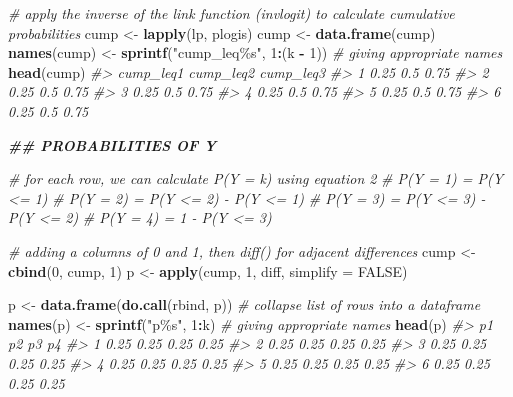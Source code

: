 \documentclass[
  man,floatsintext]{apa6}
\newenvironment{Shaded}{\begin{snugshade}}{\end{snugshade}}
\newcommand{\AttributeTok}[1]{\textcolor[rgb]{0.13,0.29,0.53}{#1}}
\newcommand{\CommentTok}[1]{\textcolor[rgb]{0.56,0.35,0.01}{\textit{#1}}}
\newcommand{\ConstantTok}[1]{\textcolor[rgb]{0.56,0.35,0.01}{#1}}
\newcommand{\DecValTok}[1]{\textcolor[rgb]{0.00,0.00,0.81}{#1}}
\newcommand{\DocumentationTok}[1]{\textcolor[rgb]{0.56,0.35,0.01}{\textbf{\textit{#1}}}}
\newcommand{\FunctionTok}[1]{\textcolor[rgb]{0.13,0.29,0.53}{\textbf{#1}}}
\newcommand{\NormalTok}[1]{#1}
\newcommand{\OtherTok}[1]{\textcolor[rgb]{0.56,0.35,0.01}{#1}}
\newcommand{\SpecialCharTok}[1]{\textcolor[rgb]{0.81,0.36,0.00}{\textbf{#1}}}
\newcommand{\StringTok}[1]{\textcolor[rgb]{0.31,0.60,0.02}{#1}}
\begin{document}
\begin{Shaded}
\begin{Highlighting}[]
\CommentTok{\# apply the inverse of the link function (invlogit) to calculate cumulative probabilities}
\NormalTok{cump }\OtherTok{\textless{}{-}} \FunctionTok{lapply}\NormalTok{(lp, plogis)}
\NormalTok{cump }\OtherTok{\textless{}{-}} \FunctionTok{data.frame}\NormalTok{(cump)}
\FunctionTok{names}\NormalTok{(cump) }\OtherTok{\textless{}{-}} \FunctionTok{sprintf}\NormalTok{(}\StringTok{"cump\_leq\%s"}\NormalTok{, }\DecValTok{1}\SpecialCharTok{:}\NormalTok{(k }\SpecialCharTok{{-}} \DecValTok{1}\NormalTok{)) }\CommentTok{\# giving appropriate names}
\FunctionTok{head}\NormalTok{(cump)}
\CommentTok{\#\textgreater{}   cump\_leq1 cump\_leq2 cump\_leq3}
\CommentTok{\#\textgreater{} 1      0.25       0.5      0.75}
\CommentTok{\#\textgreater{} 2      0.25       0.5      0.75}
\CommentTok{\#\textgreater{} 3      0.25       0.5      0.75}
\CommentTok{\#\textgreater{} 4      0.25       0.5      0.75}
\CommentTok{\#\textgreater{} 5      0.25       0.5      0.75}
\CommentTok{\#\textgreater{} 6      0.25       0.5      0.75}

\DocumentationTok{\#\# PROBABILITIES OF Y}

\CommentTok{\# for each row, we can calculate P(Y = k) using equation 2}
\CommentTok{\# P(Y = 1) = P(Y \textless{}= 1)}
\CommentTok{\# P(Y = 2) = P(Y \textless{}= 2) {-} P(Y \textless{}= 1)}
\CommentTok{\# P(Y = 3) = P(Y \textless{}= 3) {-} P(Y \textless{}= 2)}
\CommentTok{\# P(Y = 4) = 1 {-} P(Y \textless{}= 3)}

\CommentTok{\# adding a columns of 0 and 1, then diff() for adjacent differences}
\NormalTok{cump }\OtherTok{\textless{}{-}} \FunctionTok{cbind}\NormalTok{(}\DecValTok{0}\NormalTok{, cump, }\DecValTok{1}\NormalTok{)}
\NormalTok{p }\OtherTok{\textless{}{-}} \FunctionTok{apply}\NormalTok{(cump, }\DecValTok{1}\NormalTok{, diff, }\AttributeTok{simplify =} \ConstantTok{FALSE}\NormalTok{)}

\NormalTok{p }\OtherTok{\textless{}{-}} \FunctionTok{data.frame}\NormalTok{(}\FunctionTok{do.call}\NormalTok{(rbind, p)) }\CommentTok{\# collapse list of rows into a dataframe}
\FunctionTok{names}\NormalTok{(p) }\OtherTok{\textless{}{-}} \FunctionTok{sprintf}\NormalTok{(}\StringTok{"p\%s"}\NormalTok{, }\DecValTok{1}\SpecialCharTok{:}\NormalTok{k) }\CommentTok{\# giving appropriate names}
\FunctionTok{head}\NormalTok{(p)}
\CommentTok{\#\textgreater{}     p1   p2   p3   p4}
\CommentTok{\#\textgreater{} 1 0.25 0.25 0.25 0.25}
\CommentTok{\#\textgreater{} 2 0.25 0.25 0.25 0.25}
\CommentTok{\#\textgreater{} 3 0.25 0.25 0.25 0.25}
\CommentTok{\#\textgreater{} 4 0.25 0.25 0.25 0.25}
\CommentTok{\#\textgreater{} 5 0.25 0.25 0.25 0.25}
\CommentTok{\#\textgreater{} 6 0.25 0.25 0.25 0.25}


\end{Highlighting}
\end{Shaded}
\end{document}

